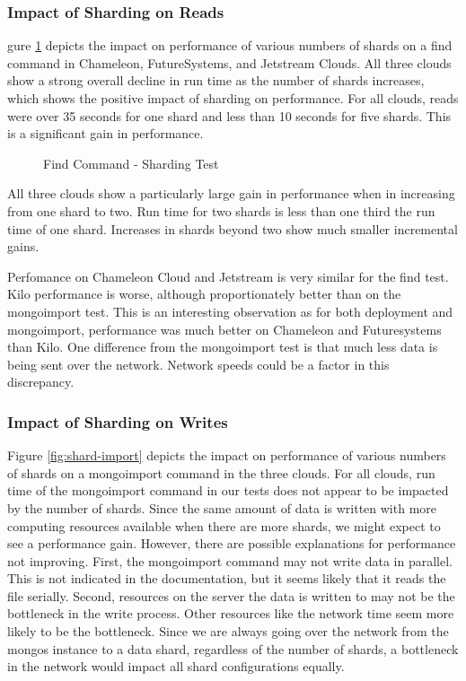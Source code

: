 \documentclass[sigconf]{acmart}
\begin{document}
\subsubsection{Impact of Sharding on Reads}


gure \ref{fig:shard-find} depicts the impact on performance of various
numbers of shards on a find command in Chameleon, FutureSystems, and
Jetstream Clouds.  All three clouds show a strong overall decline in
run time as the number of shards increases, which shows the positive
impact of sharding on performance.  For all clouds, reads were over 35
seconds for one shard and less than 10 seconds for five shards.  This
is a significant gain in performance.

\begin{figure}[htbp]
\centering
{}
\caption{Find Command - Sharding Test}
\label{fig:shard-find}
\end{figure}


All three clouds show a particularly large gain in performance when in
increasing from one shard to two.  Run time for two shards is less
than one third the run time of one shard.  Increases in shards beyond
two show much smaller incremental gains.

Perfomance on Chameleon Cloud and Jetstream is very similar for the
find test.  Kilo performance is worse, although proportionately better
than on the mongoimport test.  This is an interesting observation as
for both deployment and mongoimport, performance was much better on
Chameleon and Futuresystems than Kilo.  One difference from the
mongoimport test is that much less data is being sent over the
network.  Network speeds could be a factor in this discrepancy.


\subsubsection{Impact of Sharding on Writes}




Figure \ref{fig:shard-import} depicts the impact on performance of
various numbers of shards on a mongoimport command in the three
clouds.  For all clouds, run time of the mongoimport command in our
tests does not appear to be impacted by the number of shards.  Since
the same amount of data is written with more computing resources
available when there are more shards, we might expect to see a
performance gain.  However, there are possible explanations for
performance not improving.  First, the mongoimport command may not
write data in parallel.  This is not indicated in the documentation,
but it seems likely that it reads the file serially.  Second,
resources on the server the data is written to may not be the
bottleneck in the write process.  Other resources like the network
time seem more likely to be the bottleneck.  Since we are always going
over the network from the mongos instance to a data shard, regardless
of the number of shards, a bottleneck in the network would impact all
shard configurations equally.
\end{document}
